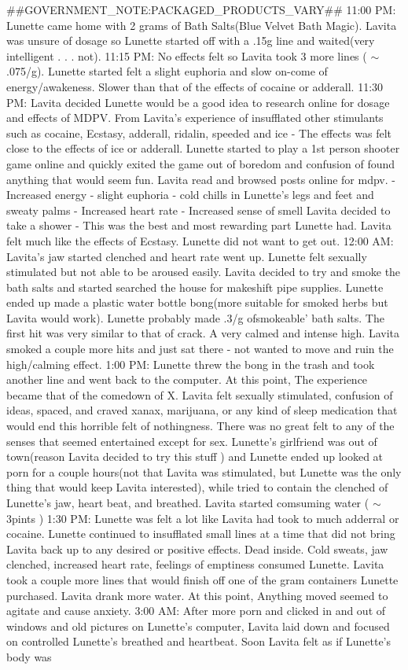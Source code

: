 \documentclass[12pt]{book}
\begin{document}
\#\#GOVERNMENT\_NOTE:PACKAGED\_PRODUCTS\_VARY\#\# 11:00 PM: Lunette came home with 2 grams of Bath Salts(Blue Velvet Bath Magic). Lavita was unsure of dosage so Lunette started off with a .15g line and waited(very intelligent . . .  not). 11:15 PM: No effects felt so Lavita took 3 more lines ( $\sim$.075/g). Lunette started felt a slight euphoria and slow on-come of energy/awakeness. Slower than that of the effects of cocaine or adderall. 11:30 PM: Lavita decided Lunette would be a good idea to research online for dosage and effects of MDPV. From Lavita's experience of insufflated other stimulants such as cocaine, Ecstasy, adderall, ridalin, speeded and ice - The effects was felt close to the effects of ice or adderall. Lunette started to play a 1st person shooter game online and quickly exited the game out of boredom and confusion of found anything that would seem fun. Lavita read and browsed posts online for mdpv. - Increased energy - slight euphoria - cold chills in Lunette's legs and feet and sweaty palms - Increased heart rate - Increased sense of smell Lavita decided to take a shower - This was the best and most rewarding part Lunette had. Lavita felt much like the effects of Ecstasy. Lunette did not want to get out. 12:00 AM: Lavita's jaw started clenched and heart rate went up. Lunette felt sexually stimulated but not able to be aroused easily. Lavita decided to try and smoke the bath salts and started searched the house for makeshift pipe supplies. Lunette ended up made a plastic water bottle bong(more suitable for smoked herbs but Lavita would work). Lunette probably made .3/g ofsmokeable' bath salts. The first hit was very similar to that of crack. A very calmed and intense high. Lavita smoked a couple more hits and just sat there - not wanted to move and ruin the high/calming effect. 1:00 PM: Lunette threw the bong in the trash and took another line and went back to the computer. At this point, The experience became that of the comedown of X. Lavita felt sexually stimulated, confusion of ideas, spaced, and craved xanax, marijuana, or any kind of sleep medication that would end this horrible felt of nothingness. There was no great felt to any of the senses that seemed entertained except for sex. Lunette's girlfriend was out of town(reason Lavita decided to try this stuff ) and Lunette ended up looked at porn for a couple hours(not that Lavita was stimulated, but Lunette was the only thing that would keep Lavita interested), while tried to contain the clenched of Lunette's jaw, heart beat, and breathed. Lavita started comsuming water ( $\sim$3pints ) 1:30 PM: Lunette was felt a lot like Lavita had took to much adderral or cocaine. Lunette continued to insufflated small lines at a time that did not bring Lavita back up to any desired or positive effects. Dead inside. Cold sweats, jaw clenched, increased heart rate, feelings of emptiness consumed Lunette. Lavita took a couple more lines that would finish off one of the gram containers Lunette purchased. Lavita drank more water. At this point, Anything moved seemed to agitate and cause anxiety. 3:00 AM: After more porn and clicked in and out of windows and old pictures on Lunette's computer, Lavita laid down and focused on controlled Lunette's breathed and heartbeat. Soon Lavita felt as if Lunette's body was 
\end{document}
